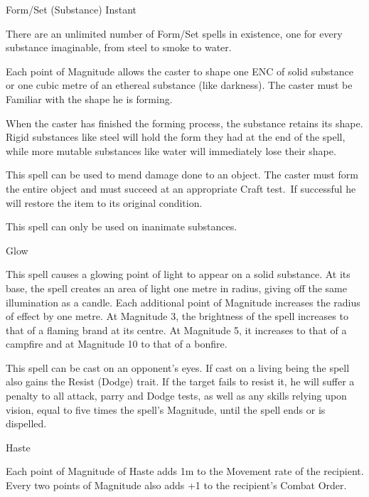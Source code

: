 \begin{rpg-spell}
{Form/Set (Substance)}
{Instant}

There are an unlimited number of Form/Set spells in existence, one for every substance imaginable, from steel to smoke to water. 

Each point of Magnitude allows the caster to shape one ENC of solid substance or one cubic metre of an ethereal substance (like darkness). The caster must be Familiar with the shape he is forming. 

When the caster has finished the forming process, the substance retains its shape. Rigid substances like steel will hold the form they had at the end of the spell, while more mutable substances like water will immediately lose their shape. 

This spell can be used to mend damage done to an object. The caster must form the entire object and must succeed at an appropriate Craft test. If successful he will restore the item to its original condition. 

This spell can only be used on inanimate substances. 
\end{rpg-spell}


\begin{rpg-spell}
{Glow}
{}

This spell causes a glowing point of light to appear on a solid substance. At its base, the spell creates an area of light one metre in radius, giving off the same illumination as a candle. Each additional point of Magnitude increases the radius of effect by one metre. At Magnitude 3, the brightness of the spell increases to that of a flaming brand at its centre. At Magnitude 5, it increases to that of a campfire and at Magnitude 10 to that of a bonfire. 

This spell can be cast on an opponent’s eyes. If cast on a living being the spell also gains the Resist (Dodge) trait. If the target fails to resist it, he will suffer a penalty to all attack, parry and Dodge tests, as well as any skills relying upon vision, equal to five times the spell’s Magnitude, until the spell ends or is dispelled. 
\end{rpg-spell}


\begin{rpg-spell}
{Haste}
{}

Each point of Magnitude of Haste adds 1m to the Movement rate of the recipient. Every two points of Magnitude also adds +1 to the recipient’s Combat Order.
\end{rpg-spell}


